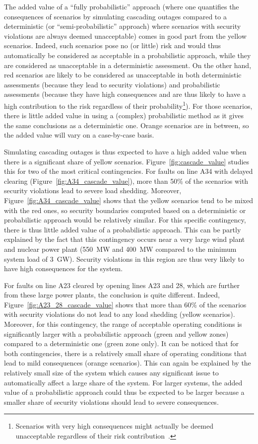 The added value of a ``fully probabilistic'' approach (\ie where one quantifies the consequences of scenarios by simulating cascading outages compared to a deterministic (or ``semi-probabilistic'' approach) where scenarios with security violations are always deemed unacceptable) comes in good part from the yellow scenarios. Indeed, such scenarios pose no (or little) risk and would thus automatically be considered as acceptable in a probabilistic approach, while they are considered as unacceptable in a deterministic assessment. On the other hand, red scenarios are likely to be considered as unacceptable in both deterministic assessments (because they lead to security violations) and probabilistic assessments (because they have high consequences and are thus likely to have a high contribution to the risk regardless of their probability\footnote{Scenarios with very high consequences might actually be deemed unacceptable regardless of their risk contribution~\cite{UCTE_Probabilistic}.}). For those scenarios, there is little added value in using a (complex) probabilistic method as it gives the same conclusions as a deterministic one. Orange scenarios are in between, so the added value will vary on a case-by-case basis.

Simulating cascading outages is thus expected to have a high added value when there is a significant share of yellow scenarios. Figure~\ref{fig:cascade_value} studies this for two of the most critical contingencies. For faults on line A34 with delayed clearing (Figure~\ref{fig:A34_cascade_value}), more than 50\% of the scenarios with security violations lead to severe load shedding. Moreover, Figure~\ref{fig:A34_cascade_value} shows that the yellow scenarios tend to be mixed with the red ones, so security boundaries computed based on a deterministic or probabilistic approach would be relatively similar. For this specific contingency, there is thus little added value of a probabilistic approach. This can be partly explained by the fact that this contingency occurs near a very large wind plant and nuclear power plant (550~MW and 400~MW compared to the minimum system load of 3~GW). Security violations in this region are thus very likely to have high consequences for the system.

For faults on line A23 cleared by opening lines A23 and 28, which are further from these large power plants, the conclusion is quite different. Indeed, Figure~\ref{fig:A23_28_cascade_value} shows that more than 60\% of the scenarios with security violations do not lead to any load shedding (yellow scenarios). Moreover, for this contingency, the range of acceptable operating conditions is significantly larger with a probabilistic approach (green and yellow zones) compared to a deterministic one (green zone only). It can be noticed that for both contingencies, there is a relatively small share of operating conditions that lead to mild consequences (orange scenarios). This can again be explained by the relatively small size of the system which causes any significant issue to automatically affect a large share of the system. For larger systems, the added value of a probabilistic approach could thus be expected to be larger because a smaller share of security violations should lead to severe consequences.

